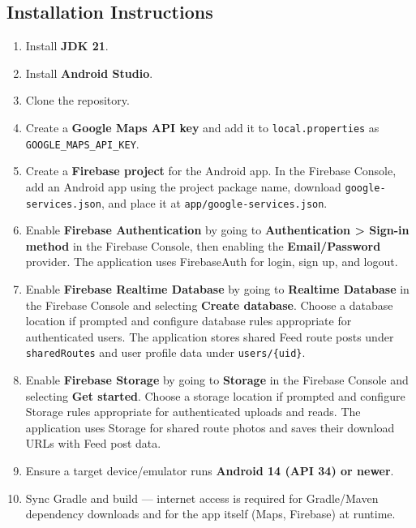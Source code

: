 \documentclass{article}
\begin{document}
                \subsection{Installation Instructions}

                \begin{enumerate}
                    \item Install \textbf{JDK 21}.
                    \item Install \textbf{Android Studio}.
                    \item Clone the repository.
                    \item Create a \textbf{Google Maps API key} and add it to \texttt{local.properties} as \texttt{GOOGLE\_MAPS\_API\_KEY}.
                    \item Create a \textbf{Firebase project} for the Android app. In the Firebase Console, add an Android app using the project package name, download \texttt{google-services.json}, and place it at \texttt{app/google-services.json}.
                    \item Enable \textbf{Firebase Authentication} by going to \textbf{Authentication > Sign-in method} in the Firebase Console, then enabling the \textbf{Email/Password} provider. The application uses FirebaseAuth for login, sign up, and logout.
                    \item Enable \textbf{Firebase Realtime Database} by going to \textbf{Realtime Database} in the Firebase Console and selecting \textbf{Create database}. Choose a database location if prompted and configure database rules appropriate for authenticated users. The application stores shared Feed route posts under \texttt{sharedRoutes} and user profile data under \texttt{users/\{uid\}}.
                    \item Enable \textbf{Firebase Storage} by going to \textbf{Storage} in the Firebase Console and selecting \textbf{Get started}. Choose a storage location if prompted and configure Storage rules appropriate for authenticated uploads and reads. The application uses Storage for shared route photos and saves their download URLs with Feed post data.
                    \item Ensure a target device/emulator runs \textbf{Android 14 (API 34) or newer}.
                    \item Sync Gradle and build --- internet access is required for Gradle/Maven dependency downloads and for the app itself (Maps, Firebase) at runtime.
                \end{enumerate}
\end{document}

